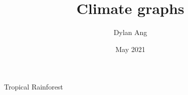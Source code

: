 \documentclass{beamer}
\title{Climate graphs}
\date{May 2021}
\author{Dylan Ang}
\begin{document}
\maketitle


\begin{frame}{Tropical Rainforest}

\end{frame}
\end{document}
